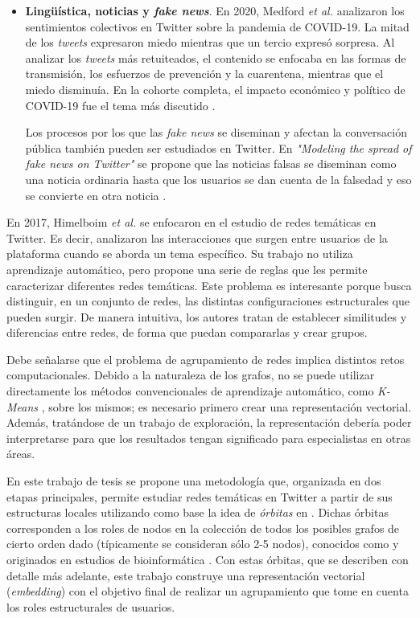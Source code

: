 \begin{itemize}
    \item \textbf{Lingüística, noticias y \textit{fake news}}. En 2020, Medford \textit{et al.} analizaron los sentimientos colectivos en Twitter sobre la pandemia de COVID-19. La mitad de los \textit{tweets} expresaron miedo mientras que un tercio expresó sorpresa. Al analizar los \textit{tweets} más retuiteados, el contenido se enfocaba en las formas de transmisión, los esfuerzos de prevención y la cuarentena, mientras que el miedo disminuía. En la cohorte completa, el impacto económico y político de COVID-19 fue el tema más discutido \cite{medford_infodemic_2020}. 

    Los procesos por los que las \textit{fake news} se diseminan y afectan la conversación pública también pueden ser estudiados en Twitter. En \textit{"Modeling the spread of fake news on Twitter"} se propone que las noticias falsas se diseminan como una noticia ordinaria hasta que los usuarios se dan cuenta de la falsedad y eso se convierte en otra noticia \cite{murayama_modeling_2021}.

\end{itemize}

En 2017, Himelboim \textit{et al.} \cite{himelboim_classifying_2017} se enfocaron en el estudio de redes temáticas en Twitter. Es decir, analizaron las interacciones que surgen entre usuarios de la plataforma cuando se aborda un tema específico. Su trabajo no utiliza aprendizaje automático, pero propone una serie de reglas que les permite caracterizar diferentes redes temáticas. Este problema es interesante porque busca distinguir, en un conjunto de redes, las distintas configuraciones estructurales que pueden surgir. De manera intuitiva, los autores tratan de establecer similitudes y diferencias entre redes, de forma que puedan compararlas y crear grupos. 

Debe señalarse que el problema de agrupamiento de redes implica distintos retos computacionales. Debido a la naturaleza de los grafos, no se puede utilizar directamente los métodos convencionales de aprendizaje automático, como \textit{K-Means} \cite{bejar_k-means_nodate}, sobre los mismos; es necesario primero crear una representación vectorial. Además, tratándose de un trabajo de exploración, la representación debería poder interpretarse para que los resultados tengan significado para especialistas en otras áreas. 

En este trabajo de tesis se propone una metodología que, organizada en dos etapas principales, permite estudiar redes temáticas en Twitter a partir de sus estructuras locales utilizando como base la idea de \textit{órbitas} \cite{sarajlic_graphlet-based_2016} en {\emph \graphlets}. Dichas órbitas corresponden a los roles de nodos en la colección de todos los posibles grafos de cierto orden dado (típicamente se consideran sólo 2-5 nodos), conocidos como \graphlets y originados en estudios de bioinformática \cite{przulj_biological_2007}. Con estas órbitas, que se describen con detalle más adelante, este trabajo construye una representación vectorial (\textit{embedding}) con el objetivo final de realizar un agrupamiento que tome en cuenta los roles estructurales de usuarios.


